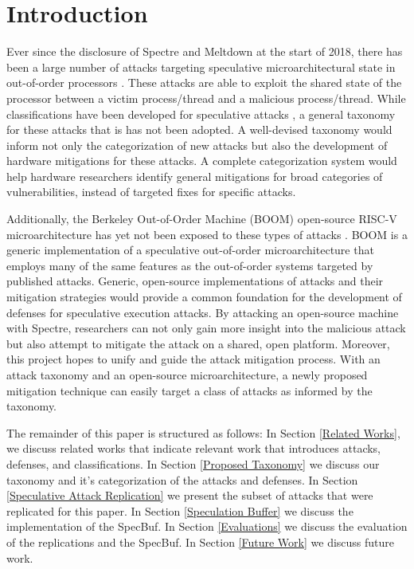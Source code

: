 \section{Introduction}

Ever since the disclosure of Spectre and Meltdown at the start of 2018, there has
been a large number of attacks targeting speculative microarchitectural state in
out-of-order processors \cite{b1,b2}. These attacks are able to exploit the shared
state of the processor between a victim process/thread and a malicious process/thread.
While classifications have been developed for speculative attacks 
\cite{b5,b6,b7,b9,b10}, a general taxonomy for these attacks that is has not been adopted.
A well-devised taxonomy would inform not only the 
categorization of new attacks but also the development of hardware mitigations for 
these attacks. A complete categorization system would help hardware researchers 
identify general mitigations for broad categories of vulnerabilities, instead of 
targeted fixes for specific attacks.

Additionally, the Berkeley Out-of-Order Machine (BOOM) open-source RISC-V
microarchitecture has yet not been exposed to these types of attacks \cite{b11}. BOOM
is a generic implementation of a speculative 
out-of-order microarchitecture that employs many of the same features as the 
out-of-order systems targeted by published attacks. Generic, open-source 
implementations of attacks and their mitigation strategies would provide a common 
foundation for the development of defenses for speculative execution attacks.
By attacking an open-source machine with Spectre, researchers can not only gain more 
insight into the malicious attack but also attempt to mitigate the attack on a shared,
open platform. Moreover, this project hopes to unify and guide the attack 
mitigation process. With an attack taxonomy and an open-source microarchitecture, a 
newly proposed mitigation technique can easily target a class of attacks as informed 
by the taxonomy.

The remainder of this paper is structured as follows: In Section \ref{Related Works}, we discuss
related works that indicate relevant work that introduces attacks, defenses, and classifications.
In Section \ref{Proposed Taxonomy} we discuss our taxonomy and it's categorization of the attacks and defenses. In
Section \ref{Speculative Attack Replication} we present the subset of attacks that were replicated for this paper. In Section \ref{Speculation Buffer}
we discuss the implementation of the SpecBuf. In Section \ref{Evaluations} we discuss the evaluation of the
replications and the SpecBuf. In Section \ref{Future Work} we discuss future work.
